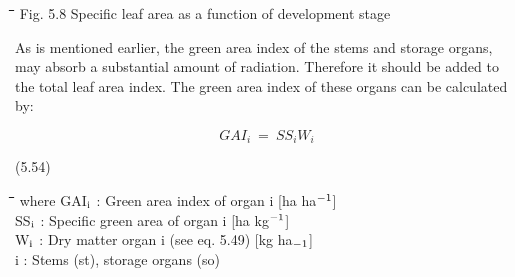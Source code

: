  


















\nwln
\begin{tabbing}
\hspace{1.27cm}\=\hspace{1.27cm}\=\hspace{1.27cm}\=\hspace{1.27cm}\=%
\hspace{1.27cm}\=\hspace{1.27cm}\=\hspace{1.27cm}\=\hspace{1.27cm}\=%
\hspace{1.27cm}\=\hspace{1.27cm}\=\kill
Fig. 5.8   Spe\-cific leaf area as a function of develop\-ment stage
\end{tabbing}



As is men\-tioned earlier, the green area index of the stems and storage or\-gans, may absorb
a substan\-tial amount of radiation. Therefore it should be added to the total leaf area
index. The green area index of these organs can be calculated by:

\begin{displaymath}
GAI  _{i} ~=~SS _{i} W _{i} 
\end{displaymath}

 
\strut\hfill (5.54)
\nwln
\begin{tabbing}
\hspace{1.27cm}\=\hspace{1.27cm}\=\hspace{1.27cm}\=\hspace{1.27cm}\=%
\hspace{1.27cm}\=\hspace{1.27cm}\=\hspace{1.27cm}\=\hspace{1.27cm}\=%
\hspace{1.27cm}\=\hspace{1.27cm}\=\kill
where GAI$_{{\rm i}}$ : Green area index of organ i         [ha ha$^{{\rm -1}}$]\\
SS$_{{\rm i}}$ : Specific green area of organ i        [ha kg$^{{\rm -1}}$]\\
W$_{{\rm i}}$ : Dry matter organ i (see eq. 5.49)        [kg ha$_{{\rm -1}}$]\\
i : Stems (st), storage organs (so)
\end{tabbing}



